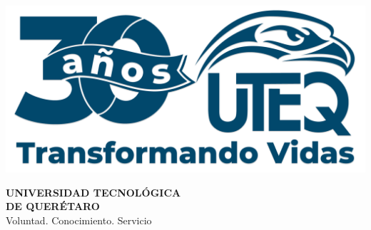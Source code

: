 \documentclass[oneside,12pt]{book}
\begin{document}
	\pagestyle{empty}
	
	\renewcommand\chaptername{UNIDAD}
	
	\frontmatter
	
	
	\begin{titlepage}
		\begin{center}
			
			
			\vspace{0.6cm}
			
			\begin{minipage}{0.3\textwidth}
				\includegraphics[width=\textwidth]{Figuras/LogoUTEQ}
			\end{minipage}
			\hfill
			\begin{minipage}{0.65\textwidth}
				\raggedleft
				{\fontsize{18}{22}\selectfont\textcolor{uteqDarkBlue}{\textbf{UNIVERSIDAD TECNOLÓGICA}}} \\
				{\fontsize{18}{22}\selectfont\textcolor{uteqDarkBlue}{\textbf{DE QUERÉTARO}}} \\
				\vspace{0.1cm}
				{\fontsize{9}{11}\selectfont\textcolor{uteqGreen}{Voluntad. Conocimiento. Servicio}}
			\end{minipage}
			
			\vspace{2cm}
			

\end{center}
\end{titlepage}
\end{document}

